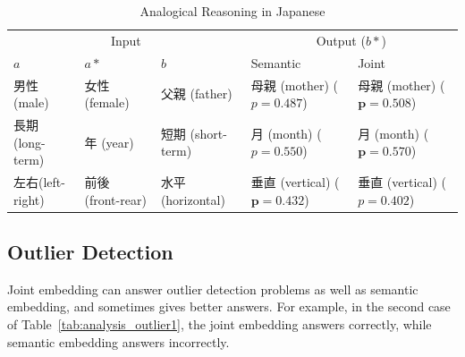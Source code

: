 \begin{table}[h]
    \centering
    \begin{CJK}{UTF8}{long}
        \begin{tabularx}{\textwidth}{lllbb}
            \toprule
            \multicolumn{3}{c}{Input} & \multicolumn{2}{c}{Output ($b*$)} \\
            \cmidrule(lr){1-3} \cmidrule(lr){4-5} $a$ & $a*$ & $b$ & Semantic & Joint \\\midrule
            \vspace{0.2cm} 男性(male) & 女性 (female) & 父親 (father) & 母親 (mother) \newline ($p=0.487$) & 母親 (mother) \newline ($\bm{p=0.508}$) \\
            \vspace{0.2cm} 長期 (long-term) & 年 (year) & 短期 (short-term) & 月 (month) \newline ($p=0.550$) & 月 (month) \newline ($\bm{p=0.570}$) \\
            左右(left-right) & 前後 (front-rear) & 水平 (horizontal) & 垂直 (vertical) \newline ($\bm{p=0.432}$) & 垂直 (vertical) \newline ($p=0.402$) \\\bottomrule
        \end{tabularx}
    \end{CJK}
    \caption{Analogical Reasoning in Japanese}
    \label{tab:analysis_analogy2}
\end{table}

\subsection{Outlier Detection} \label{sec:analysis_outlier}

\begin{CJK}{UTF8}{gbsn}    
    Joint embedding can answer outlier detection problems as well as semantic embedding, and sometimes gives better answers. For example, in the second case of Table~\ref{tab:analysis_outlier1}, the joint embedding answers correctly, while semantic embedding answers incorrectly.
\end{CJK}

